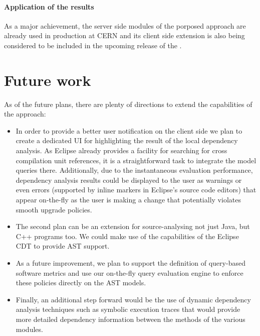 
% 

\paragraph*{Application of the results}
As a major achievement, the server side modules of the porposed approach are
already used in production at CERN and its client side extension is also being
considered to be included in the upcoming release of the \ptool.

\section{Future work}
As of the future plans, there are plenty of directions to extend the
capabilities of the approach:
\begin{itemize}
\item In order to provide a better user notification on the client side we plan
to create a dedicated UI for highlighting the result of the local dependency
analysis. As Eclipse already provides a facility for searching for cross
compilation unit references, it is a straightforward task to integrate the model
queries there. Additionally, due to the instantaneous evaluation performance,
dependency analysis results could be displayed to the user as warnings or even
errors (supported by inline markers in Eclipse's source code editors) that
appear on-the-fly as the user is making a change that potentially violates
smooth upgrade policies.


\item The second plan can be an extension for source-analysing not just Java,
but C++ programs too. We could make use of the capabilities of the Eclipse CDT
to provide AST support.

\item As a future improvement, we plan to support the definition of query-based
software metrics and use our on-the-fly query evaluation engine to enforce these
policies directly on the AST models.

\item Finally, an additional step forward would be the use of dynamic dependency
analysis techniques such as symbolic execution traces that would provide more
detailed dependency information between the methods of the various modules.
\end{itemize}
